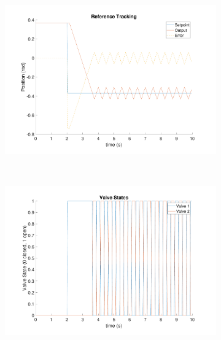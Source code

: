 \documentclass[11pt,a4paper]{article}
\begin{document}
\begin{figure}[!hbt]
    \centering
    \begin{subfigure}[t]{0.45\textwidth}
    \centering
    \includegraphics[width=\textwidth]{figure9.pdf}
    \caption{}
    \end{subfigure}
    ~
    \begin{subfigure}[t]{0.45\textwidth}
    \centering
    \includegraphics[width=\textwidth]{figure10.pdf}
    \caption{}
    \end{subfigure}\\
    \begin{subfigure}[t]{0.45\textwidth}
    \centering

\end{subfigure}
\end{figure}
\end{document}
